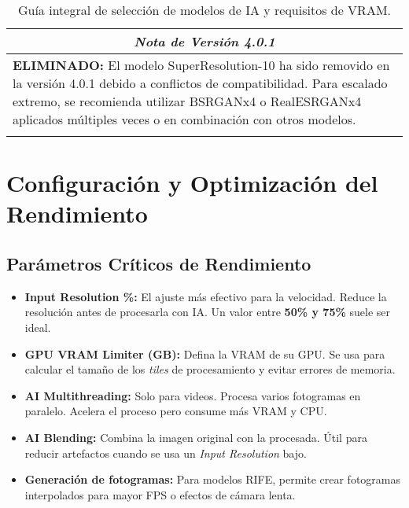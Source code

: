 \documentclass[11pt, a4paper]{article}
\begin{document}
\begin{longtable}{p{2.8cm} p{1.8cm} p{1.2cm} p{1.5cm} p{7.2cm}}
\midrule
\multicolumn{5}{c}{\textit{\textbf{Nota de Versión 4.0.1}}} \\
\midrule
\multicolumn{5}{p{14cm}}{\textbf{ELIMINADO:} El modelo SuperResolution-10 ha sido removido en la versión 4.0.1 debido a conflictos de compatibilidad. Para escalado extremo, se recomienda utilizar BSRGANx4 o RealESRGANx4 aplicados múltiples veces o en combinación con otros modelos.} \\
\bottomrule
\caption{Guía integral de selección de modelos de IA y requisitos de VRAM.}
\label{tab:modelos}
\end{longtable}


\section{Configuración y Optimización del Rendimiento}

\subsection{Parámetros Críticos de Rendimiento}
\begin{itemize}[leftmargin=*]
    \item \textbf{Input Resolution \%:} El ajuste más efectivo para la velocidad. Reduce la resolución antes de procesarla con IA. Un valor entre \textbf{50\% y 75\%} suele ser ideal.
    \item \textbf{GPU VRAM Limiter (GB):} Defina la VRAM de su GPU. Se usa para calcular el tamaño de los \textit{tiles} de procesamiento y evitar errores de memoria.
    \item \textbf{AI Multithreading:} Solo para videos. Procesa varios fotogramas en paralelo. Acelera el proceso pero consume más VRAM y CPU.
    \item \textbf{AI Blending:} Combina la imagen original con la procesada. Útil para reducir artefactos cuando se usa un \textit{Input Resolution} bajo.
    \item \textbf{Generación de fotogramas:} Para modelos RIFE, permite crear fotogramas interpolados para mayor FPS o efectos de cámara lenta.
\end{itemize}
\end{document}
